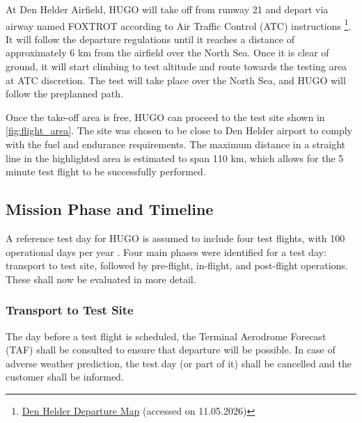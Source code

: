At Den Helder Airfield, HUGO will take off from runway 21 and depart via airway named FOXTROT according to Air Traffic Control (ATC) instructions  \footnote{\href{https://nl.ivao.aero/downloads/specops_loa/ehkd.pdf}{Den Helder Departure Map} (accessed on 11.05.2026)}. It will follow the departure regulations until it reaches a distance of approximately 6 km from the airfield over the North Sea. Once it is clear of ground, it will start climbing to test altitude and route towards the testing area at ATC discretion. The test will take place over the North Sea, and HUGO will follow the preplanned path.



Once the take-off area is free, HUGO can proceed to the test site shown in \autoref{fig:flight_area}. The site was chosen to be close to Den Helder airport to comply with the fuel and endurance requirements. The maximum distance in a straight line in the highlighted area is estimated to span 110 km, which allows for the 5 minute test flight to be successfully performed.

\subsection{Mission Phase and Timeline}
A reference test day for HUGO is assumed to include four
test flights, with 100 operational days per year . Four main phases were identified for a test day: transport to test site, followed by pre-flight, in-flight, and post-flight operations. These shall now be evaluated in more detail.


\subsubsection{Transport to Test Site}
The day before a test flight is scheduled, the Terminal Aerodrome Forecast (TAF) shall be consulted to ensure that departure will be possible. In case of adverse weather prediction, the test day (or part of it) shall be cancelled and the customer shall be informed. 


